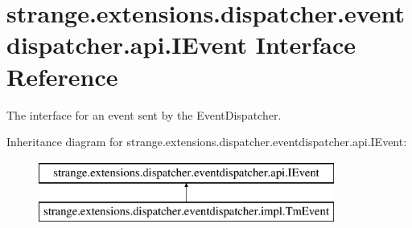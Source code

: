 \hypertarget{interfacestrange_1_1extensions_1_1dispatcher_1_1eventdispatcher_1_1api_1_1_i_event}{\section{strange.\-extensions.\-dispatcher.\-eventdispatcher.\-api.\-I\-Event Interface Reference}
\label{interfacestrange_1_1extensions_1_1dispatcher_1_1eventdispatcher_1_1api_1_1_i_event}
}


The interface for an event sent by the Event\-Dispatcher.  


Inheritance diagram for strange.\-extensions.\-dispatcher.\-eventdispatcher.\-api.\-I\-Event\-:\begin{figure}[H]
\begin{center}
\leavevmode
\includegraphics[height=2.000000cm]{interfacestrange_1_1extensions_1_1dispatcher_1_1eventdispatcher_1_1api_1_1_i_event}
\end{center}
\end{figure}
